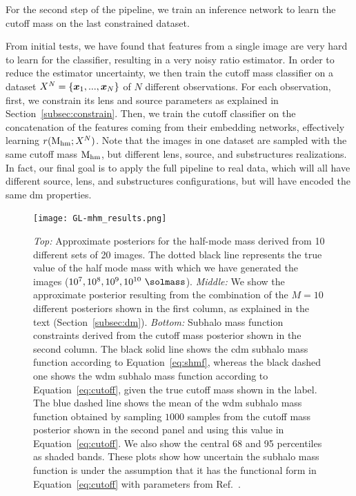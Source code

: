 For the second step of the pipeline, we train an inference network to learn the cutoff mass on the last constrained dataset. 

From initial tests, we have found that features from a single image are very hard to learn for the classifier, resulting in a very noisy ratio estimator.
In order to reduce the estimator uncertainty, we then train the cutoff mass classifier on a dataset $X^N=\{\bm{x}_1, ..., \bm{x}_N\}$ of $N$ different observations. For each observation, first, we constrain its lens and source parameters as explained in Section~\ref{subsec:constrain}. Then, we train the cutoff classifier on the concatenation of the features coming from their embedding networks, effectively learning $r(\mathrm{M_{hm}}; X^N)$. 
Note that the images in one dataset are sampled with the same cutoff mass $\mathrm{M_{hm}}$, but different lens, source, and substructures realizations. In fact, our final goal is to apply the full pipeline to real data, which will all have different source, lens, and substructures configurations, but will have encoded the same \gls*{dm} properties. 

\begin{figure}
	\centering
	\texttt{[image: GL-mhm\_results.png]}
	\caption{\textit{Top:} Approximate posteriors for the half-mode mass derived from 10 different sets of 20 images. The dotted black line represents the true value of the half mode mass with which we have generated the images ($10^7, 10^8, 	10^9,  10^{10} \ \si{\solmass}$). \textit{Middle:} We show the approximate posterior resulting from the combination of the $M=10$ different posteriors shown in the first column, as explained in the text (Section~\ref{subsec:dm}). \textit{Bottom:} Subhalo mass function constraints derived from the cutoff mass posterior shown in the second column. The black solid line shows the \gls*{cdm} subhalo mass function according to Equation~\eqref{eq:shmf}, whereas the black dashed one shows the \gls*{wdm} subhalo mass function according to Equation~\eqref{eq:cutoff}, given the true cutoff mass shown in the label. The blue dashed line shows the mean of the \gls*{wdm} subhalo mass function obtained by sampling $1000$ samples from the cutoff mass posterior shown in the second panel and using this value in Equation~\eqref{eq:cutoff}. We also show the central \num{68} and \num{95} percentiles as shaded bands. These plots show how uncertain the subhalo mass function is under the assumption that it has the functional form in Equation~\eqref{eq:cutoff} with parameters from Ref.~\cite{Lovell:2020bcy}.}
\label{fig:mhm_results}
\end{figure}

